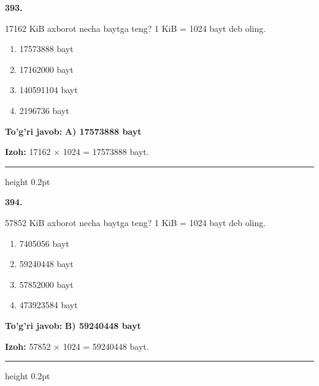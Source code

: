 \documentclass[10pt,a4paper,oneside]{article}
\begin{document}
\noindent\textbf{\color{ink}393.}
\par
17162 KiB axborot necha baytga teng? 1 KiB = 1024 bayt deb oling.
\begin{enumerate}[label=\Alph*),leftmargin=9mm]
\item 17573888 bayt
\item 17162000 bayt
\item 140591104 bayt
\item 2196736 bayt
\end{enumerate}
\begin{tcolorbox}[enhanced,breakable,colback=teal!4,colframe=teal!50!black,boxrule=0.5pt,arc=1.1mm,left=3mm,right=3mm,top=1.7mm,bottom=1.7mm,before skip=2mm,after skip=2mm]
\textbf{\color{teal}To'g'ri javob:} \textbf{A) 17573888 bayt}
\par\smallskip
\textbf{Izoh:} 17162 \ensuremath{\times} 1024 = 17573888 bayt.
\end{tcolorbox}
\vspace{2mm}\hrule height 0.2pt \vspace{3mm}

\noindent\textbf{\color{ink}394.}
\par
57852 KiB axborot necha baytga teng? 1 KiB = 1024 bayt deb oling.
\begin{enumerate}[label=\Alph*),leftmargin=9mm]
\item 7405056 bayt
\item 59240448 bayt
\item 57852000 bayt
\item 473923584 bayt
\end{enumerate}
\begin{tcolorbox}[enhanced,breakable,colback=teal!4,colframe=teal!50!black,boxrule=0.5pt,arc=1.1mm,left=3mm,right=3mm,top=1.7mm,bottom=1.7mm,before skip=2mm,after skip=2mm]
\textbf{\color{teal}To'g'ri javob:} \textbf{B) 59240448 bayt}
\par\smallskip
\textbf{Izoh:} 57852 \ensuremath{\times} 1024 = 59240448 bayt.
\end{tcolorbox}
\vspace{2mm}\hrule height 0.2pt \vspace{3mm}
\end{document}
